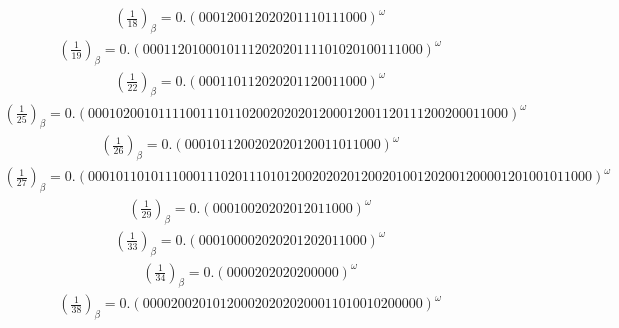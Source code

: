 \documentclass[fleqn]{article}
\begin{document}
\begin{equation*}
\begin{split}
(\frac{1}{18})_\beta = 0.(000120012020201110111000)^\omega
\end{split}\end{equation*}
\begin{equation*}
\begin{split}
(\frac{1}{19})_\beta = 0.(0001120100010111202020111101020100111000)^\omega
\end{split}\end{equation*}
\begin{equation*}
\begin{split}
(\frac{1}{22})_\beta = 0.(000110112020201120011000)^\omega
\end{split}\end{equation*}
\begin{equation*}
\begin{split}
(\frac{1}{25})_\beta = 0.(000102001011110011101102002020201200012001120111200200011000)^\omega
\end{split}\end{equation*}
\begin{equation*}
\begin{split}
(\frac{1}{26})_\beta = 0.(0001011200202020120011011000)^\omega
\end{split}\end{equation*}
\begin{equation*}
\begin{split}
(\frac{1}{27})_\beta = 0.(000101101011100011102011101012002020201200201001202001200001201001011000)^\omega
\end{split}\end{equation*}
\begin{equation*}
\begin{split}
(\frac{1}{29})_\beta = 0.(00010020202012011000)^\omega
\end{split}\end{equation*}
\begin{equation*}
\begin{split}
(\frac{1}{33})_\beta = 0.(000100002020201202011000)^\omega
\end{split}\end{equation*}
\begin{equation*}
\begin{split}
(\frac{1}{34})_\beta = 0.(0000202020200000)^\omega
\end{split}\end{equation*}
\begin{equation*}
\begin{split}
(\frac{1}{38})_\beta = 0.(0000200201012000202020200011010010200000)^\omega
\end{split}\end{equation*}
\end{document}
